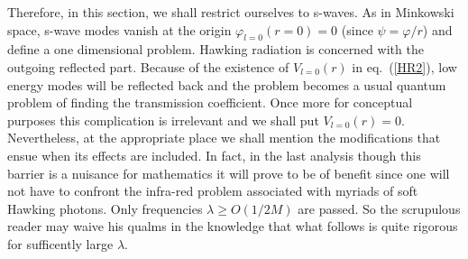 \documentclass[12pt,oneside]{report}
\def\la{\lambda}
\begin{document}
Therefore, in this section, we shall 
restrict ourselves to s-waves.
 As in Minkowski space, s-wave
modes vanish at the origin
$ \varphi_{l=0} (r=0) = 0$ (since $\psi = \varphi /r$)
 and define a one dimensional problem. 
Hawking
radiation is concerned  with the outgoing
reflected part. 
Because of the existence of $ V_{l=0} (r)$ in eq.~(\ref {HR2}),
low energy modes will be reflected back and the problem becomes a usual quantum
problem of finding the transmission coefficient. Once more for conceptual
purposes this complication is irrelevant and 
we shall put $ V_{l=0} (r) =0$. 
Nevertheless, at the appropriate place we shall mention the
modifications that ensue when its effects are included. In fact, in the last
analysis though this barrier is a nuisance 
for mathematics it will prove to be of
benefit since one will not have to 
confront the infra-red problem associated with
myriads of soft Hawking photons. Only frequencies $ \la \geq O ( 1/2M)$  are
passed. So the scrupulous reader may waive his qualms in the
knowledge that what follows is quite rigorous for sufficently large
$\la$.
\end{document}
